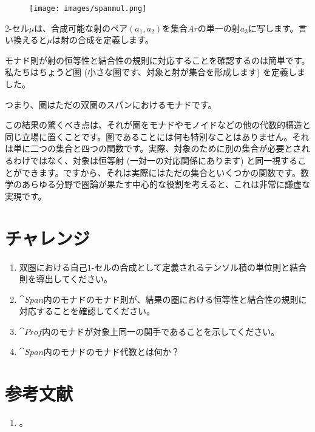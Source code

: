 \begin{figure}[H]
  \centering
  \texttt{[image: images/spanmul.png]}
\end{figure}

\noindent
$2$-セル$\mu$は、合成可能な射のペア$(a_1, a_2)$を集合$\mathit{Ar}$の単一の射$a_3$に写します。言い換えると$\mu$は射の合成を定義します。

モナド則が射の恒等性と結合性の規則に対応することを確認するのは簡単です。私たちはちょうど圏 (小さな圏です、対象と射が集合を形成します) を定義しました。

つまり、圏はただの双圏のスパンにおけるモナドです。

この結果の驚くべき点は、それが圏をモナドやモノイドなどの他の代数的構造と同じ立場に置くことです。圏であることには何も特別なことはありません。それは単に二つの集合と四つの関数です。実際、対象のために別の集合が必要とされるわけではなく、対象は恒等射 (一対一の対応関係にあります) と同一視することができます。ですから、それは実際にはただの集合といくつかの関数です。数学のあらゆる分野で圏論が果たす中心的な役割を考えると、これは非常に謙虚な実現です。

\section{チャレンジ}

\begin{enumerate}
  \tightlist
  \item
        双圏における自己$1$-セルの合成として定義されるテンソル積の単位則と結合則を導出してください。
  \item
        $\cat{Span}$内のモナドのモナド則が、結果の圏における恒等性と結合性の規則に対応することを確認してください。
  \item
        $\cat{Prof}$内のモナドが対象上同一の関手であることを示してください。
  \item
        $\cat{Span}$内のモナドのモナド代数とは何か？
\end{enumerate}

\section{参考文献}
\begin{enumerate}
  \tightlist
  \item
        。
\end{enumerate}

